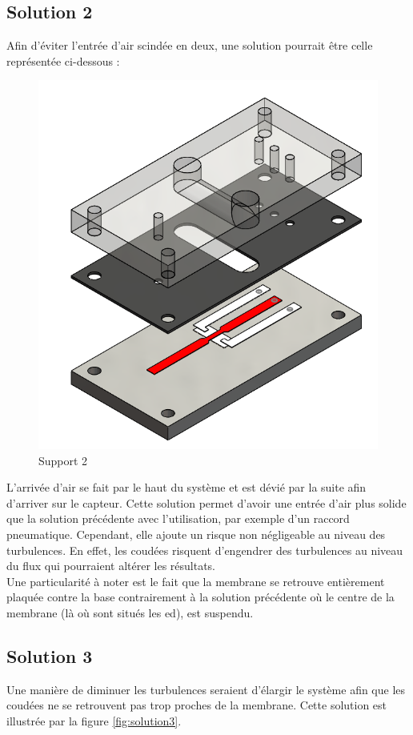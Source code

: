 \subsection{Solution 2}
Afin d'éviter l'entrée d'air scindée en deux, une solution pourrait être celle représentée ci-dessous :
\begin{figure}[H]
    \centering
    \includegraphics[scale = 0.4]{assets/figures/design2_eclate.png}
    \caption{Support 2}
    \label{fig:solution2}
\end{figure}
L'arrivée d'air se fait par le haut du système et est dévié par la suite afin d'arriver sur le capteur. Cette solution permet d'avoir une
entrée d'air plus solide que la solution précédente avec l'utilisation, par exemple d'un raccord pneumatique. Cependant, elle ajoute un risque 
non négligeable au niveau des turbulences. En effet, les coudées risquent d'engendrer des turbulences au niveau du flux qui pourraient altérer 
les résultats.\\
Une particularité à noter est le fait que la membrane se retrouve entièrement plaquée contre la base contrairement à la solution
précédente où le centre de la membrane (là où sont situés les \gls{ed}), est suspendu.

\subsection{Solution 3}
Une manière de diminuer les turbulences seraient d'élargir le système afin que les coudées ne se retrouvent pas trop proches de la
membrane. Cette solution est illustrée par la figure \ref{fig:solution3}. 

